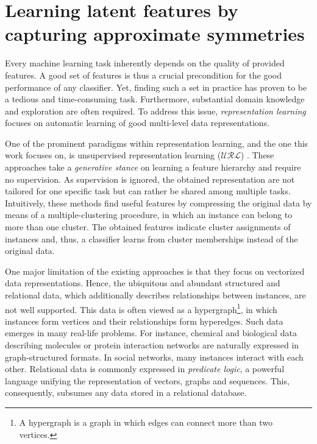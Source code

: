 \chapter{Learning latent features by capturing approximate symmetries}\label{ch:symmetries}

Every machine learning task inherently depends on the quality of provided features.
A good set of features is thus a crucial precondition for the good performance of any classifier. 
Yet, finding such a set in practice has proven to be a tedious and time-consuming task.
Furthermore, substantial domain knowledge and exploration are often required.
To address this issue,  \textit{representation learning} \cite{Bengio:2009} focuses on automatic learning of good multi-level data representations.


One of the prominent paradigms within representation learning, and the one this work focuses on, is unsupervised representation learning ($\mathcal{URL}$) \cite{Hinton504,Bengio07greedylayer-wise,RanzatoBL07}.
These approaches take a \textit{generative stance} on learning a feature hierarchy and require no supervision.
As supervision is ignored, the obtained representation are not tailored for one specific task but can rather be shared among multiple tasks.
Intuitively, these methods find useful features by compressing the original data by means of a  multiple-clustering procedure, in which an instance can belong to more than one cluster.
The obtained features indicate cluster assignments of instances and, thus, a classifier learns from cluster memberships instead of the original data.


One major limitation of the existing approaches is that they focus on vectorized data representations.
Hence, the ubiquitous and abundant structured and relational data, which additionally describes relationships between instances, are not well supported. 
This data is often viewed as a hypergraph\footnote{A hypergraph is a graph in which edges can connect more than two vertices.}, in which instances form vertices and their relationships form hyperedges.
Such data emerges in many real-life problems.
For instance, chemical and biological data describing molecules or protein interaction networks are naturally expressed in graph-structured formats.
In social networks, many instances interact with each other.
Relational data is commonly expressed in \textit{predicate logic}, a powerful language unifying the representation of vectors, graphs and sequences.
This, consequently, subsumes any data stored in a relational database.



